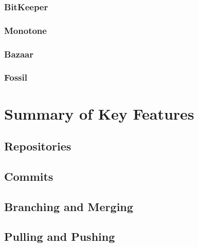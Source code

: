 \subsubsection{BitKeeper}
\newpage
\newpage
\subsubsection{Monotone}
\newpage
\newpage
\subsubsection{Bazaar}
\newpage
\newpage
\subsubsection{Fossil}
\newpage
\newpage
\section{Summary of Key Features}
\subsection{Repositories}
\subsection{Commits}
\newpage
\subsection{Branching and Merging}
\newpage
\subsection{Pulling and Pushing}
\newpage
